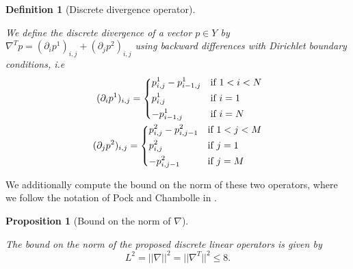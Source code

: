 \documentclass{scrreprt}
\newtheorem{proposition}[theorem]{Proposition}
\newtheorem{definition}[theorem]{Definition}
\begin{document}
        \begin{definition}[Discrete divergence operator] %
        \label{def:discrete_divergence_operator}

            We define the discrete divergence of a vector $p \in Y$ by $\nabla^{T} p = (\partial_{i}p^{1})_{i, j} + (\partial_{j}p^{2})_{i, j}$ using backward differences with Dirichlet boundary conditions, i.e
                \begin{eqnarray}
                    (\partial_{i}p^{1})_{i, j} =
                        \begin{dcases*}
                            p^{1}_{i, j} - p^{1}_{i-1, j} & \textnormal{if $1 < i < N$}\\
                            p^{1}_{i, j} & \textnormal{if $i = 1$}\\
                            -p^{1}_{i-1, j} & \textnormal{if $i = N$}
                        \end{dcases*} \notag \\
                    (\partial_{j}p^{2})_{i, j} =
                        \begin{dcases*}
                            p^{2}_{i, j} - p^{2}_{i, j-1} & \textnormal{if $1 < j < M$}\\
                            p^{2}_{i, j} & \textnormal{if $j = 1$}\\
                            -p^{2}_{i, j-1} & \textnormal{if $j = M$}
                        \end{dcases*} \notag
                \end{eqnarray}

        \end{definition}

        We additionally compute the bound on the norm of these two operators, where we follow the notation of Pock and Chambolle in \cite{Chambolle10afirst-order}.

        \begin{proposition}[Bound on the norm of $\nabla$] %
            \label{prop:bound_on_the_norm}

            The bound on the norm of the proposed discrete linear operators is given by
                $$
                    L^{2} = ||\nabla||^{2} = ||\nabla^{T}||^{2} \le 8.
                $$
        \end{proposition}
\end{document}
